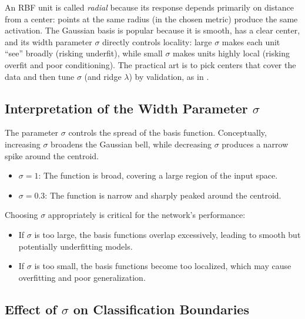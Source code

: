 \begin{tcolorbox}[summarybox, title={Why ``radial''? Why a Gaussian?}]
An RBF unit is called \emph{radial} because its response depends primarily on distance from a center: points at the same radius (in the chosen metric) produce the same activation. The Gaussian basis is popular because it is smooth, has a clear center, and its width parameter \(\sigma\) directly controls locality: large \(\sigma\) makes each unit ``see'' broadly (risking underfit), while small \(\sigma\) makes units highly local (risking overfit and poor conditioning). The practical art is to pick centers that cover the data and then tune \(\sigma\) (and ridge \(\lambda\)) by validation, as in .
\end{tcolorbox}

\subsection{Interpretation of the Width Parameter \texorpdfstring{\(\sigma\)}{sigma}}
\label{sec:rbf_interpretation_of_the_width_parameter_sigma}

The parameter \(\sigma\) controls the spread of the basis function. Conceptually, increasing \(\sigma\) broadens the Gaussian bell, while decreasing \(\sigma\) produces a narrow spike around the centroid.

\begin{itemize}
    \item \(\sigma = 1\): The function is broad, covering a large region of the input space.
    \item \(\sigma = 0.3\): The function is narrow and sharply peaked around the centroid.
\end{itemize}

Choosing \(\sigma\) appropriately is critical for the network's performance:
\begin{itemize}
    \item If \(\sigma\) is too large, the basis functions overlap excessively, leading to smooth but potentially underfitting models.
    \item If \(\sigma\) is too small, the basis functions become too localized, which may cause overfitting and poor generalization.
\end{itemize}

\subsection{Effect of \texorpdfstring{\(\sigma\)}{sigma} on Classification Boundaries}
\label{sec:rbf_effect_of_sigma_on_classification_boundaries}

